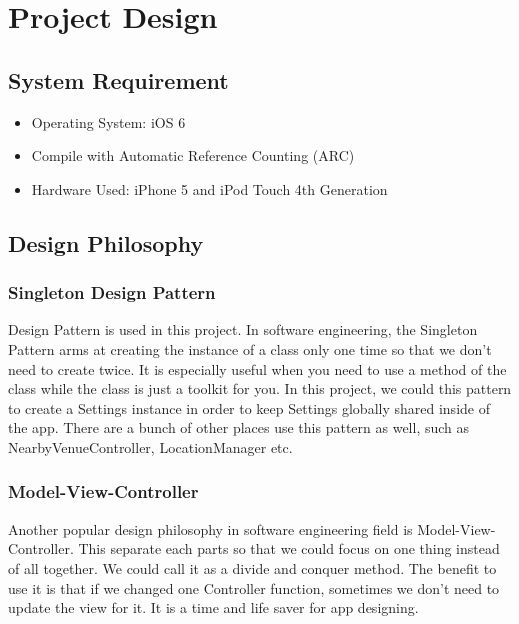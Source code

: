 \chapter{Project Design}

\section{System Requirement} %
\label{sec:system_requirement}

\begin{itemize}
\item Operating System: iOS 6
\item Compile with Automatic Reference Counting (ARC)
\item Hardware Used: iPhone 5 and iPod Touch 4th Generation
\end{itemize}
 
\newpage

\section{Design Philosophy} %
\label{sec:design_pholosiphy}

\subsection{Singleton Design Pattern} %
\label{sub:singleton_design_pattern}

	Design Pattern is used in this project. In software engineering, the Singleton Pattern arms at creating the instance of a class only one time so that we don't need to create twice. It is especially useful when you need to use a method of the class while the class is just a toolkit for you. In this project, we could this pattern to create a Settings instance in order to keep Settings globally shared inside of the app. There are a bunch of other places use this pattern as well, such as NearbyVenueController, LocationManager etc. \\
	

\subsection{Model-View-Controller} %
\label{sub:model_view_controller}

	Another popular design philosophy in software engineering field is Model-View-Controller. This separate each parts so that we could focus on one thing instead of all together. We could call it as a divide and conquer method. The benefit to use it is that if we changed one Controller function, sometimes we don't need to update the view for it. It is a time and life saver for app designing. \\
	
